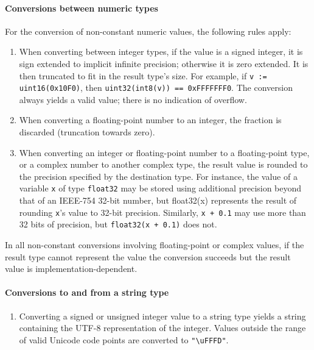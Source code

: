 {\paragraph{Conversions between numeric types}

For the conversion of non-constant numeric values, the following rules
apply:

\begin{enumerate}
\item
  When converting between integer types, if the value is a signed
  integer, it is sign extended to implicit infinite precision; otherwise
  it is zero extended. It is then truncated to fit in the result type's
  size. For example, if \texttt{v := uint16(0x10F0)}, then
  \texttt{uint32(int8(v)) == 0xFFFFFFF0}. The conversion always yields a
  valid value; there is no indication of overflow.
\item
  When converting a floating-point number to an integer, the fraction is
  discarded (truncation towards zero).
\item
  When converting an integer or floating-point number to a
  floating-point type, or a complex number to another complex type, the
  result value is rounded to the precision specified by the destination
  type. For instance, the value of a variable \texttt{x} of type
  \texttt{float32} may be stored using additional precision beyond that
  of an IEEE-754 32-bit number, but float32(x) represents the result of
  rounding \texttt{x}'s value to 32-bit precision. Similarly,
  \texttt{x + 0.1} may use more than 32 bits of precision, but
  \texttt{float32(x + 0.1)} does not.
\end{enumerate}

In all non-constant conversions involving floating-point or complex
values, if the result type cannot represent the value the conversion
succeeds but the result value is implementation-dependent.

\paragraph{Conversions to and from a string type}

\begin{enumerate}
\item
  Converting a signed or unsigned integer value to a string type yields
  a string containing the UTF-8 representation of the integer. Values
  outside the range of valid Unicode code points are converted to
  \texttt{"\textbackslash{}uFFFD"}.


\end{enumerate}}
